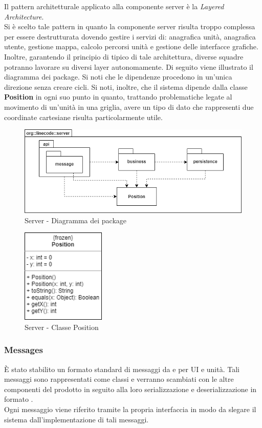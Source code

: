 Il pattern architetturale applicato alla componente server è la \textit{Layered Architecture}. \\
Si è scelto tale pattern in quanto la componente server risulta troppo complessa per essere destrutturata dovendo gestire i servizi di: anagrafica unità, anagrafica utente, gestione mappa, calcolo percorsi unità e gestione delle interfacce grafiche.\\
Inoltre, garantendo il principio di  tipico di tale architettura, diverse squadre potranno lavorare su diversi layer autonomamente.
Di seguito viene illustrato il diagramma dei package. Si noti che le dipendenze procedono in un'unica direzione senza creare cicli. Si noti, inoltre, che il sistema dipende dalla classe \textbf{Position} in ogni suo punto in quanto, trattando problematiche legate al movimento di un'unità in una griglia, avere un tipo di dato che rappresenti due coordinate cartesiane risulta particolarmente utile.

\begin{figure}[H]
	\centering
	\includegraphics[width=12cm]{img/server_package.png}
	\caption{Server - Diagramma dei package}
\end{figure}

\begin{figure}[H]
    \centering
    \includegraphics[width=4cm]{img/class_position.png}
    \caption{Server - Classe Position}
\end{figure}

\subsubsection{Messages}
È stato stabilito un formato standard di messaggi da e per UI e unità. Tali messaggi sono rappresentati come classi  e verranno scambiati con le altre componenti del prodotto in seguito alla loro serializzazione e deserializzazione in formato .\\
Ogni messaggio viene riferito tramite la propria interfaccia in modo da slegare il sistema dall'implementazione di tali messaggi.

